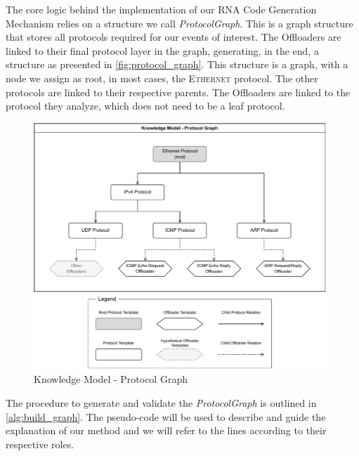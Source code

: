 The core logic behind the implementation of our RNA Code Generation Mechanism relies on a structure we call \textit{ProtocolGraph}. This is a graph structure that stores all protocols required for our events of interest. The Offloaders are linked to their final protocol layer in the graph, generating, in the end, a structure as presented in \autoref{fig:protocol_graph}. This structure is a graph, with a node we assign as root, in most cases, the \textsc{Ethernet} protocol. The other protocols are linked to their respective parents. The Offloaders are linked to the protocol they analyze, which does not need to be a leaf protocol.

\begin{figure}[htb]
    \caption{Knowledge Model - Protocol Graph}
    \begin{center}
        \includegraphics[width=0.98\textwidth]{images/icmp_ex_protocol_graph.pdf}  
    \end{center}
    \label{fig:protocol_graph}
\end{figure}

The procedure to generate and validate the \textit{ProtocolGraph} is outlined in \autoref{alg:build_graph}. The pseudo-code will be used to describe and guide the explanation of our method and we will refer to the lines according to their respective roles.

